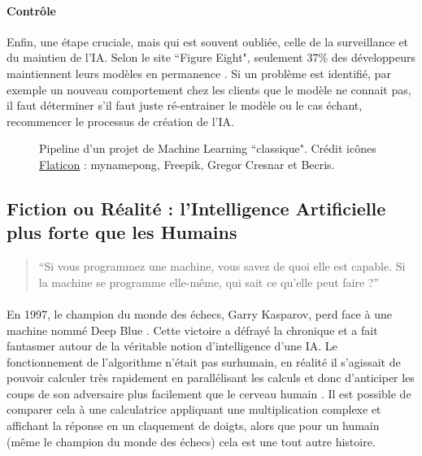 \documentclass[10pt, french, a4paper]{report}
\begin{document}
\paragraph{Contrôle}
Enfin, une étape cruciale, mais qui est souvent oubliée, celle de la surveillance et du maintien de l'IA. Selon le site ``Figure Eight", seulement 37\% des développeurs maintiennent leurs modèles en permanence \citep{figure_eight_state_2019}. Si un problème est identifié, par exemple un nouveau comportement chez les clients que le modèle ne connait pas, il faut déterminer s'il faut juste ré-entrainer le modèle ou le cas échant, recommencer le processus de création de l'IA.  

\begin{center}
\begin{figure}[hbt!]
    \caption{Pipeline d'un projet de Machine Learning ``classique". Crédit icônes \href{https://www.flaticon.com/}{Flaticon} : mynamepong, Freepik, Gregor Cresnar et Becris.}
\end{figure}
\end{center}

\subsection{Fiction ou Réalité : l'Intelligence Artificielle plus forte que les Humains}

\begin{quotation}
  ``Si vous programmez une machine, vous savez de quoi elle est capable. Si la machine se programme elle-même, qui sait ce qu'elle peut faire ?''
\end{quotation}

\paragraph{}
En 1997, le champion du monde des échecs, Garry Kasparov, perd face à une machine nommé Deep Blue \citep{krauthammer_be_1997}. Cette victoire a défrayé la chronique et a fait fantasmer autour de la véritable notion d'intelligence d'une IA. Le fonctionnement de l'algorithme n'était pas surhumain, en réalité il s'agissait de pouvoir calculer très rapidement en parallélisant les calculs et donc d’anticiper les coups de son adversaire plus facilement que le cerveau humain \citep{hsu_deep_1995}. Il est possible de comparer cela à une calculatrice appliquant une multiplication complexe et affichant la réponse en un claquement de doigts, alors que pour un humain (même le champion du monde des échecs) cela est une tout autre histoire.
\end{document}
